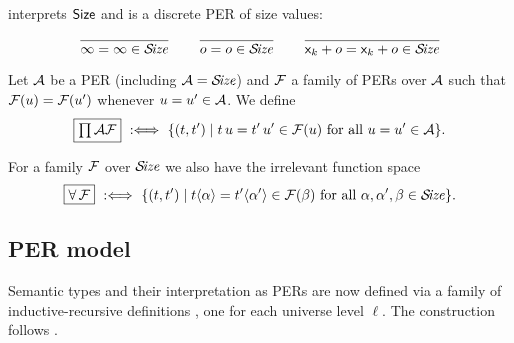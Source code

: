 \documentclass[acmlarge,review,anonymous]{acmart}\settopmatter{printfolios=true}
\begin{document}
\fbox{$\SIZE$} interprets $\mathsf{Size}$ and is a discrete PER of size values:
\vspace{-1ex}
\begin{gather*}
  \ru{
    }{\infty = \infty \in \SIZE}
\qquad
  \ru{
    }{o = o \in \SIZE}
\qquad
  \ru{
    }{\lev k + o = \lev k + o \in \SIZE}
\end{gather*}

Let $\mathcal{A}$ be a PER (including $\mathcal{A} = \mathcal{S}\!\mathit{ize}$) and $\mathcal{F}$ a family of PERs over $\mathcal{A}$ such that
$\mathcal{F}(u) = \mathcal{F}(u')$ whenever $u = u' \in \mathcal{A}$.  We define
\[
  \fbox{$\prod\mathcal{A}\mathcal{F}$} \mathrel{\ :\Longleftrightarrow\ } \{(t,t') \mid t\,u = t'\,u' \in \mathcal{F}(u) \ \mbox{for all}\  u = u' \in \mathcal{A} \}
  .
\]

For a family $\mathcal{F}$ over $\SIZE$ we also have the irrelevant function space
\[
  \fbox{$\forall\,\mathcal{F}$} \mathrel{\ :\Longleftrightarrow\ }
  \{(t,t') \mid t \langle\alpha\rangle = t' \langle\alpha'\rangle \in \mathcal{F}(\beta) \ \mbox{for all}\  \alpha,\alpha',\beta \in \mathcal{S}\!\mathit{ize} \}
  .
\]




\subsection{PER model}
\label{sec:permodel}

Semantic types and their interpretation as PERs are now defined via a
family of inductive-recursive definitions \cite{dybjer:jsl00}, one for
each universe level $\ell$.  The construction follows \citet{abelCoquandDybjer:lics07}.
\end{document}
